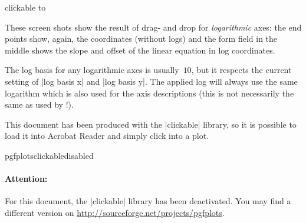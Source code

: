 \begin{pgfplotslibrary}{clickable}
	\noindent
	\hbox to %

	\nobreak
	These screen shots show the result of drag- and drop for \emph{logarithmic} axes: the end points show, again, the coordinates (without logs) and the form field in the middle shows the slope and offset of the linear equation in log coordinates.

	The log basis for any logarithmic axes is usually~$10$, but it respects the current setting of |log basis x| and |log basis y|. The applied log will always use the same logarithm which is also used for the axis descriptions (this is not necessarily the same as used by \PGFPlotstable!).

	This document has been produced with the |clickable| library, so it is possible to load it into Acrobat Reader and simply click into a plot.
	
	\expandafter\ifx\csname pgfplotsclickabledisabled\endcsname\relax
	\else
	\paragraph{Attention:} For this document, the |clickable| library has been deactivated. You may find a different version on \url{http://sourceforge.net/projects/pgfplots}.
	\fi


\end{pgfplotslibrary}
